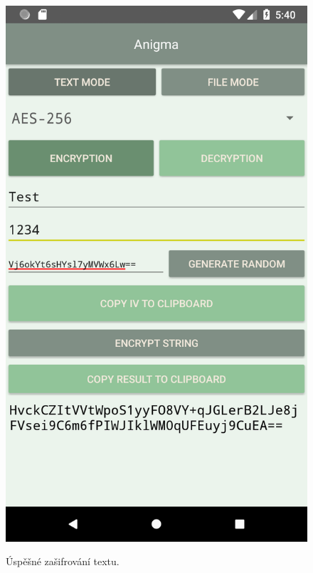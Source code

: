 \documentclass[12pt, a4paper]{article}
\begin{document}
\begin{figure}[h]
\caption{Úspěšné zašifrování textu.}
\centering
\includegraphics[height=0.4\textheight]{text_enc_success}
\label{fig:text_enc_success}
\end{figure}
\end{document}
